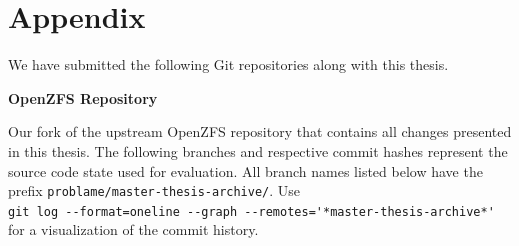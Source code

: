 \documentclass[12pt,a4paper,twoside]{book}
\begin{document}
\backmatter

\chapter{Appendix}\label{ch:appendix}

We have submitted the following Git repositories along with this thesis.

\newcommand{\appendixsection}[1]{\textbf{\large #1}}

\appendixsection{OpenZFS Repository}

Our fork of the upstream OpenZFS repository that contains all changes presented in this thesis.
The following branches and respective commit hashes represent the source code state used for evaluation.
All branch names listed below have the prefix \lstinline{problame/master-thesis-archive/}.
Use \\ \lstinline{git log --format=oneline --graph --remotes='*master-thesis-archive*'} for a visualization of the commit history.

%
\end{document}
